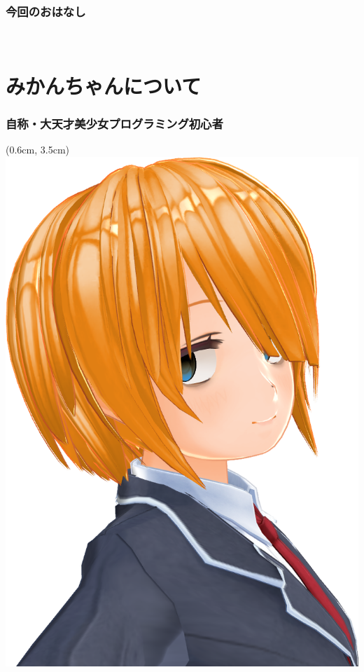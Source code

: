 \documentclass[
  lualatex,
  aspectratio=169,
  14pt
]{beamer}
\begin{document}
\begin{frame}
  \frametitle{今回のおはなし}

  ~\\[-.25\baselineskip]
  \tableofcontents
\end{frame}

\section*{みかんちゃんについて}

\begin{frame}
  \frametitle{自称・大天才美少女プログラミング初心者}

  \begin{textblock*}{0.5\paperwidth}(0.6cm, 3.5cm)
    \includegraphics[width=0.3\paperwidth]{./images/mikanchan.png}

\end{textblock*}
\end{frame}
\end{document}
